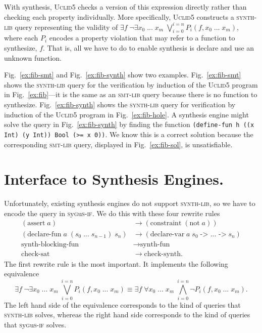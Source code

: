 \documentclass[acmsmall]{acmart}
\newcommand{\uclid}{{\textsc{Uclid5}}\xspace}
\newcommand{\smtlib}{{\textsc{smt-lib}}\xspace}
\newcommand{\sygusif}{{\textsc{s}y\textsc{g}u\textsc{s-if}}\xspace}
\newcommand{\llamalib}{{\textsc{synth-lib}}\xspace}
\newcommand{\codelike}[1]{\texttt{#1}}
\begin{document}
With synthesis, \uclid checks a version of this expression directly rather than
checking each property individually. More specifically, \uclid constructs a
\llamalib query representing the validity of $ \exists f \; \neg \exists
x_{0}\;...\; x_{m}\; \bigvee_{i=0}^{i=n} P_i(f, x_{0}\;...\; x_{m})$, where
each $P_i$ encodes a property violation that may refer to a function to
synthesize, $f$. That is, all we have to do to enable synthesis is declare and
use an unknown function.

Fig.~\ref{ex:fib-smt} and Fig.~\ref{ex:fib-synth} show two examples.
Fig.~\ref{ex:fib-smt} shows the \llamalib query for the verification by
induction of the \uclid program in Fig.~\ref{ex:fib}---it is the same as an
\smtlib query because there is no function to synthesize.
Fig.~\ref{ex:fib-synth} shows the \llamalib query for verification by induction
of the \uclid program in Fig.~\ref{ex:fib-hole}. A synthesis engine might solve
the query in Fig.~\ref{ex:fib-synth} by finding the function
\codelike{(define-fun h ((x Int) (y Int)) Bool (>= x 0))}. We know this is a
correct solution because the corresponding \smtlib query, displayed in
Fig.~\ref{ex:fib-sol}, is unsatisfiable.

\section{Interface to Synthesis Engines.} Unfortunately, existing synthesis
engines do not support \llamalib, so we have to encode the query in \sygusif.
We do this with these four rewrite rules \begin{align} (\text{assert} \; a)
&\rightarrow (\text{constraint} \; (\text{not} \; a))\\ (\text{declare-fun} \;
a \;(s_0 \;...\; s_{n-1})\; s_n) &\rightarrow (\text{declare-var} \; a \; s_0
\;\text{-> ... ->}\; s_n)\\ \text{synth-blocking-fun} &\rightarrow
\text{synth-fun} \\ \text{check-sat} &\rightarrow \text{check-synth}.
\end{align} The first rewrite rule is the most important. It implements the
following equivalence $$ \exists f \; \neg \exists x_{0}\;...\; x_{m}\;
\bigvee_{i=0}^{i=n} P_i(f, x_{0}\;...\; x_{m}) \equiv \exists f \; \forall
x_{0}\;...\; x_{m}\; \bigwedge_{i=0}^{i=n} \neg P_i(f, x_{0}\;...\; x_{m}).$$
The left hand side of the equivalence corresponds to the kind of queries that
\llamalib solves, whereas the right hand side corresponds to the kind of
queries that \sygusif solves.
\end{document}

